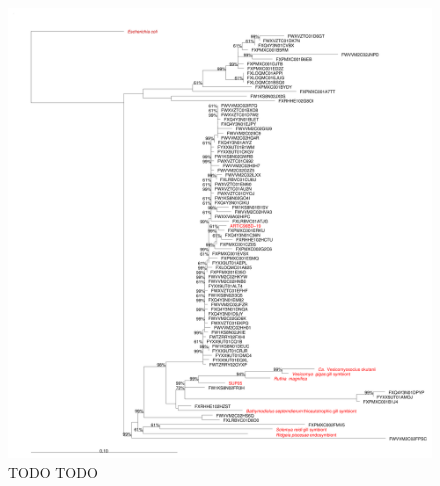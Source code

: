 \begin{figure}
  \centering
  \includegraphics[width=\textwidth]{../polarfront/GSO-EOSA-1tree.png}
  \caption[TODO TODO]{TODO TODO
  }
  \label{fig:GSO-EOSA-1tree}
\end{figure}
